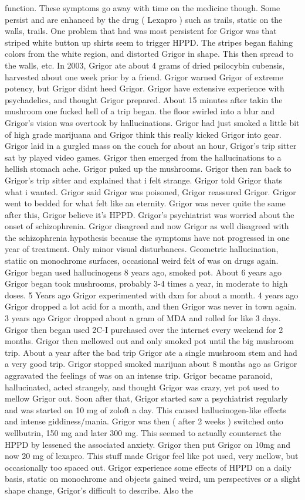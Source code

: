 \documentclass[12pt]{book}
\begin{document}
function. These symptoms go away with time on the medicine though. Some persist and are enhanced by the drug ( Lexapro ) such as trails, static on the walls, trails. One problem that had was most persistent for Grigor was that striped white button up shirts seem to trigger HPPD. The stripes began flahing colors from the white region, and distorted Grigor in shape. This then spread to the walls, etc. In 2003, Grigor ate about 4 grams of dried psilocybin cubensis, harvested about one week prior by a friend. Grigor warned Grigor of extreme potency, but Grigor didnt heed Grigor. Grigor have extensive experience with psychadelics, and thought Grigor prepared. About 15 minutes after takin the mushroom one fucked hell of a trip began. the floor swirled into a blur and Grigor's vision was overtook by hallucinations. Grigor had just smoked a little bit of high grade marijuana and Grigor think this really kicked Grigor into gear. Grigor laid in a gurgled mass on the couch for about an hour, Grigor's trip sitter sat by played video games. Grigor then emerged from the hallucinations to a hellish stomach ache. Grigor puked up the mushrooms. Grigor then ran back to Grigor's trip sitter and explained that i felt strange. Grigor told Grigor thats what i wanted. Grigor said Grigor was poisoned, Grigor reassured Grigor. Grigor went to bedded for what felt like an eternity. Grigor was never quite the same after this, Grigor believe it's HPPD. Grigor's psychiatrist was worried about the onset of schizophrenia. Grigor disagreed and now Grigor as well disagreed with the schizophrenia hypothesis because the symptoms have not progressed in one year of treatment. Only minor visual disturbances. Geometric hallucination, statiic on monochrome surfaces, occasional weird felt of was on drugs again. Grigor began used hallucinogens 8 years ago, smoked pot. About 6 years ago Grigor began took mushrooms, probably 3-4 times a year, in moderate to high doses. 5 Years ago Grigor experimented with dxm for about a month. 4 years ago Grigor dropped a lot acid for a month, and then Grigor was never in town again. 3 years ago Grigor dropped about a gram of MDA and rolled for like 3 days. Grigor then began used 2C-I purchased over the internet every weekend for 2 months. Grigor then mellowed out and only smoked pot until the big mushroom trip. About a year after the bad trip Grigor ate a single mushroom stem and had a very good trip. Grigor stopped smoked marijuan about 8 months ago as Grigor aggravated the feelings of was on an intense trip. Grigor became paranoid, hallucinated, acted strangely, and thought Grigor was crazy, yet pot used to mellow Grigor out. Soon after that, Grigor started saw a psychiatrist regularly and was started on 10 mg of zoloft a day. This caused hallucinogen-like effects and intense giddiness/mania. Grigor was then ( after 2 weeks ) switched onto wellbutrin, 150 mg and later 300 mg. This seemed to actually counteract the HPPD by lessened the associated anxiety. Grigor then put Grigor on 10mg and now 20 mg of lexapro. This stuff made Grigor feel like pot used, very mellow, but occasionally too spaced out. Grigor experience some effects of HPPD on a daily basis, static on monochrome and objects gained weird, um perspectives or a slight shape change, Grigor's difficult to describe. Also the 
\end{document}
